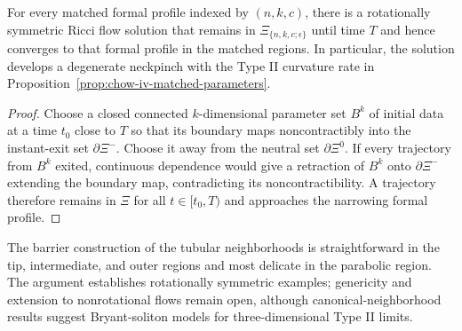 \begin{theorem}
\label{thm:chow-iv-wazewski-degenerate-neckpinch}
For every matched formal profile indexed by $(n,k,c)$, there is a rotationally
symmetric Ricci flow solution that remains in
$\Xi_{\{n,k,c;\epsilon\}}$ until time $T$ and hence converges to that formal
profile in the matched regions.  In particular, the solution develops a
degenerate neckpinch with the Type II curvature rate in
Proposition~\ref{prop:chow-iv-matched-parameters}.
\end{theorem}
\begin{proof}
\sketch
Choose a closed connected $k$-dimensional parameter set $B^k$ of initial data
at a time $t_0$ close to $T$ so that its boundary maps noncontractibly into
the instant-exit set $\partial\Xi^-$.  Choose it away from the neutral set
$\partial\Xi^0$.  If every trajectory from $B^k$ exited, continuous dependence
would give a retraction of $B^k$ onto $\partial\Xi^-$ extending the boundary
map, contradicting its noncontractibility.  A trajectory therefore remains in
$\Xi$ for all $t\in[t_0,T)$ and approaches the narrowing formal profile.
\end{proof}

\begin{remark}
\label{rem:chow-iv-degenerate-neckpinch-scope}
The barrier construction of the tubular neighborhoods is straightforward in
the tip, intermediate, and outer regions and most delicate in the parabolic
region.  The argument establishes rotationally symmetric examples; genericity
and extension to nonrotational flows remain open, although canonical-neighborhood
results suggest Bryant-soliton models for three-dimensional Type II limits.
\end{remark}
